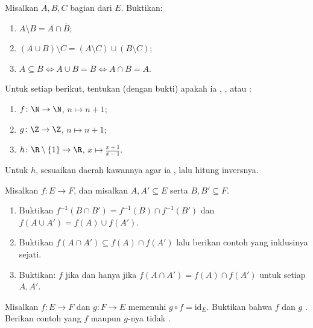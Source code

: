 \begin{exercise}[$\star$]\label{exo:b1:logic:6}
Misalkan $A, B, C$  bagian dari $E$. Buktikan:
\begin{enumerate}
  \item $A \setminus B = A \cap \overline{B}$;
  \item $(A \cup B) \setminus C = (A \setminus C) \cup (B \setminus
        C)$;
  \item $A \subseteq B \iff A \cup B = B \iff A \cap B = A$.
\end{enumerate}
\end{exercise}

\begin{exercise}[$\star\star$]\label{exo:b1:logic:7}
Untuk setiap  berikut, tentukan (dengan bukti) apakah ia
, , atau :
\begin{enumerate}
  \item $f \colon \N \to \N$, $n \mapsto n + 1$;
  \item $g \colon \Z \to \Z$, $n \mapsto n + 1$;
  \item $h \colon \R \setminus \{1\} \to \R$, $x \mapsto
        \frac{x+1}{x-1}$.
\end{enumerate}
Untuk $h$, sesuaikan daerah kawannya agar ia , lalu hitung
inversnya.
\end{exercise}

\begin{exercise}[$\star\star$]\label{exo:b1:logic:8}
Misalkan $f \colon E \to F$, dan misalkan $A, A' \subseteq E$ serta
$B, B' \subseteq
F$.
\begin{enumerate}
  \item Buktikan $f^{-1}(B \cap B') = f^{-1}(B) \cap f^{-1}(B')$ dan
        $f(A \cup A') = f(A) \cup f(A')$.
  \item Buktikan $f(A \cap A') \subseteq f(A) \cap f(A')$ lalu berikan
        contoh yang inklusinya sejati.
  \item Buktikan: $f$  jika dan hanya jika $f(A \cap A') = f(A)
        \cap f(A')$ untuk setiap $A, A'$.
\end{enumerate}
\end{exercise}

\begin{exercise}[$\star\star$]\label{exo:b1:logic:9}
Misalkan $f \colon E \to F$ dan $g \colon F \to E$ memenuhi $g \circ f =
\mathrm{id}_E$. Buktikan bahwa $f$  dan $g$ .
Berikan contoh yang $f$ maupun $g$-nya tidak .
\end{exercise}

